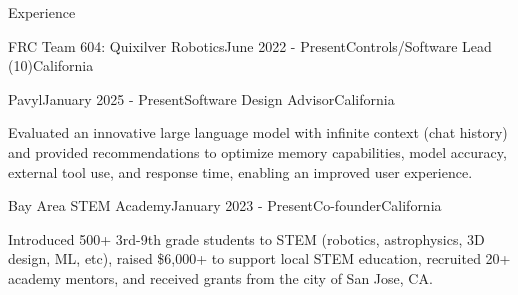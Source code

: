 \documentclass[
  10pt, %
]{resume}
\begin{document}
\begin{rSection}{Experience}
\begin{rSubsection}{FRC Team 604: Quixilver Robotics}{June 2022 - Present}{Controls/Software Lead (10)}{California}
  \end{rSubsection}
        
  \begin{rSubsection}{Pavyl}{January 2025 - Present}{Software Design Advisor}{California}
    
    \item Evaluated an innovative large language model with infinite context (chat history) and provided recommendations to optimize memory capabilities, model accuracy, external tool use, and response time, enabling an improved user experience.
    
  \end{rSubsection}
        
  \begin{rSubsection}{Bay Area STEM Academy}{January 2023 - Present}{Co-founder}{California}
    
    \item Introduced 500+ 3rd-9th grade students to STEM (robotics, astrophysics, 3D design, ML, etc), raised \$6,000+ to support local STEM education, recruited 20+ academy mentors, and received grants from the city of San Jose, CA.
    
  \end{rSubsection}
        
	
\end{rSection}

\end{document}
